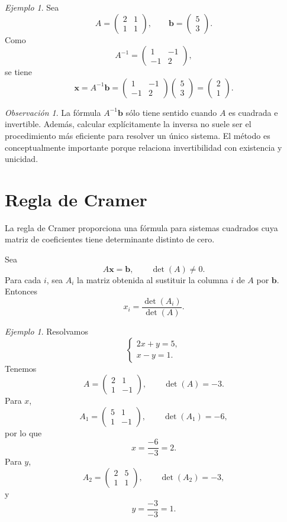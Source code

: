 \documentclass[12pt]{article}
\theoremstyle{remark}
\newtheorem{observacion}[definicion]{Observación}
\newtheorem{ejemplo}[definicion]{Ejemplo}
\begin{document}
\begin{ejemplo}
Sea
\[
A=
\begin{pmatrix}
2&1\\
1&1
\end{pmatrix},
\qquad
\mathbf b=
\begin{pmatrix}5\\3\end{pmatrix}.
\]
Como
\[
A^{-1}=
\begin{pmatrix}
1&-1\\
-1&2
\end{pmatrix},
\]
se tiene
\[
\mathbf x=A^{-1}\mathbf b
=
\begin{pmatrix}
1&-1\\
-1&2
\end{pmatrix}
\begin{pmatrix}5\\3\end{pmatrix}
=
\begin{pmatrix}2\\1\end{pmatrix}.
\]
\end{ejemplo}

\begin{observacion}
La fórmula $A^{-1}\mathbf b$ sólo tiene sentido cuando $A$ es cuadrada e invertible. Además, calcular
explícitamente la inversa no suele ser el procedimiento más eficiente para resolver un único sistema.
El método es conceptualmente importante porque relaciona invertibilidad con existencia y unicidad.
\end{observacion}

\section{Regla de Cramer}

La regla de Cramer proporciona una fórmula para sistemas cuadrados cuya matriz de coeficientes tiene
determinante distinto de cero.

Sea
\[
A\mathbf x=\mathbf b,\qquad \det(A)\neq0.
\]
Para cada $i$, sea $A_i$ la matriz obtenida al sustituir la columna $i$ de $A$ por $\mathbf b$. Entonces
\[
\boxed{x_i=\frac{\det(A_i)}{\det(A)}}.
\]

\begin{ejemplo}
Resolvamos
\[
\begin{cases}
2x+y=5,\\
x-y=1.
\end{cases}
\]
Tenemos
\[
A=
\begin{pmatrix}2&1\\1&-1\end{pmatrix},
\qquad
\det(A)=-3.
\]
Para $x$,
\[
A_1=
\begin{pmatrix}5&1\\1&-1\end{pmatrix},
\qquad
\det(A_1)=-6,
\]
por lo que
\[
x=\frac{-6}{-3}=2.
\]
Para $y$,
\[
A_2=
\begin{pmatrix}2&5\\1&1\end{pmatrix},
\qquad
\det(A_2)=-3,
\]
y
\[
y=\frac{-3}{-3}=1.
\]
\end{ejemplo}
\end{document}
